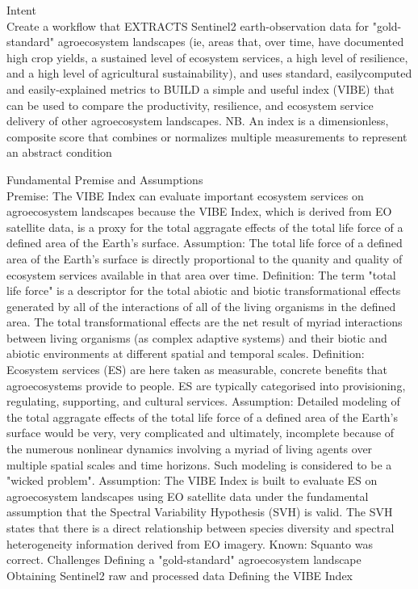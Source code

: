 \documentclass[12pt, letterpaper]{article}
\begin{document}
\begin{outline}[enumerate]
\1 Intent \\
Create a workflow that EXTRACTS Sentinel2 earth-observation data for "gold-standard" agroecosystem landscapes (ie, areas that, over time, have documented high crop yields, a sustained level of ecosystem services, a high level of resilience, and a high level of agricultural sustainability), and uses standard, easilycomputed and easily-explained metrics to BUILD a simple and useful index (VIBE) that can be used to compare the productivity, resilience, and ecosystem service delivery of other agroecosystem landscapes. NB. An index is a dimensionless, composite score that combines or normalizes multiple measurements to represent an abstract condition

\1 Fundamental Premise and Assumptions\\
\2 Premise: The VIBE Index can evaluate important ecosystem services on agroecosystem landscapes because the VIBE Index, which is derived from EO satellite data, is a proxy for the total aggragate effects of the total life force of a defined area of the Earth's surface.
\2 Assumption: The total life force of a defined area of the Earth's surface is directly proportional to the quanity and quality of ecosystem services available in that area over time. 
\2 Definition: The term "total life force" is a descriptor for the total abiotic and biotic transformational effects generated by all of the interactions of all of the living organisms in the defined area. The total transformational effects are the net result of myriad interactions between living organisms (as complex adaptive systems) and their biotic and abiotic environments  at different spatial and temporal scales.
\2 Definition: Ecosystem services (ES) are here taken as measurable, concrete benefits that agroecosystems provide to people. ES are typically categorised into provisioning, regulating, supporting, and cultural services. 
\2 Assumption: Detailed modeling of the total aggragate effects of the total life force of a defined area of the Earth's surface would be very, very complicated and ultimately, incomplete because of the numerous nonlinear dynamics involving a myriad of living agents over multiple spatial scales and time horizons. Such modeling is considered to be a "wicked problem".
\2 Assumption: The VIBE Index is built to evaluate ES on agroecosystem landscapes using EO satellite data under the fundamental assumption that the Spectral Variability Hypothesis (SVH) is valid. The SVH states that there is a direct relationship between species diversity and spectral heterogeneity information derived from EO imagery.
\2 Known: Squanto was correct.
\1 Challenges
\2 Defining a "gold-standard" agroecosystem landscape
\2 Obtaining Sentinel2 raw and processed data
\2 Defining the VIBE Index

\end{outline}
\end{document}
